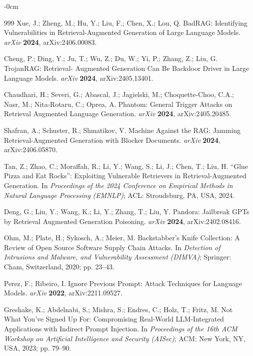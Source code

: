 \documentclass[information,article,submit,moreauthors]{Definitions/mdpi}
\begin{document}
\begin{adjustwidth}{-\extralength}{0cm}
\begin{thebibliography}{999}
Xue, J.; Zheng, M.; Hu, Y.; Liu, F.; Chen, X.; Lou, Q. BadRAG: Identifying Vulnerabilities in
Retrieval-Augmented Generation of Large Language Models. \textit{arXiv} \textbf{2024},
arXiv:2406.00083.

Cheng, P.; Ding, Y.; Ju, T.; Wu, Z.; Du, W.; Yi, P.; Zhang, Z.; Liu, G. TrojanRAG: Retrieval-
Augmented Generation Can Be Backdoor Driver in Large Language Models. \textit{arXiv}
\textbf{2024}, arXiv:2405.13401.

Chaudhari, H.; Severi, G.; Abascal, J.; Jagielski, M.; Choquette-Choo, C.A.; Nasr, M.;
Nita-Rotaru, C.; Oprea, A. Phantom: General Trigger Attacks on Retrieval Augmented Language
Generation. \textit{arXiv} \textbf{2024}, arXiv:2405.20485.

Shafran, A.; Schuster, R.; Shmatikov, V. Machine Against the RAG: Jamming Retrieval-Augmented
Generation with Blocker Documents. \textit{arXiv} \textbf{2024}, arXiv:2406.05870.

Tan, Z.; Zhao, C.; Moraffah, R.; Li, Y.; Wang, S.; Li, J.; Chen, T.; Liu, H. ``Glue Pizza and
Eat Rocks'': Exploiting Vulnerable Retrievers in Retrieval-Augmented Generation. In
\textit{Proceedings of the 2024 Conference on Empirical Methods in Natural Language Processing
(EMNLP)}; ACL: Stroudsburg, PA, USA, 2024.

Deng, G.; Liu, Y.; Wang, K.; Li, Y.; Zhang, T.; Liu, Y. Pandora: Jailbreak GPTs by Retrieval
Augmented Generation Poisoning. \textit{arXiv} \textbf{2024}, arXiv:2402.08416.

Ohm, M.; Plate, H.; Sykosch, A.; Meier, M. Backstabber's Knife Collection: A Review of Open
Source Software Supply Chain Attacks. In \textit{Detection of Intrusions and Malware, and
Vulnerability Assessment (DIMVA)}; Springer: Cham, Switzerland, 2020; pp. 23--43.


Perez, F.; Ribeiro, I. Ignore Previous Prompt: Attack Techniques for Language Models.
\textit{arXiv} \textbf{2022}, arXiv:2211.09527.

Greshake, K.; Abdelnabi, S.; Mishra, S.; Endres, C.; Holz, T.; Fritz, M. Not What You've Signed
Up For: Compromising Real-World LLM-Integrated Applications with Indirect Prompt Injection. In
\textit{Proceedings of the 16th ACM Workshop on Artificial Intelligence and Security (AISec)};
ACM: New York, NY, USA, 2023; pp. 79--90.


\end{thebibliography}
\end{adjustwidth}
\end{document}
